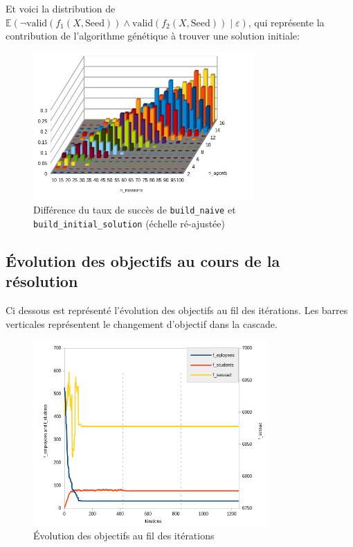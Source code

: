 \documentclass[11pt]{article}
\begin{document}
Et voici la distribution de $\mathbb{E}(\neg \text{valid}(f_1(X, \text{Seed})) \land \text{valid}(f_2(X, \text{Seed})) \;\vert\; \varepsilon)$, qui représente la contribution de l'algorithme génétique à trouver une solution initiale:

\begin{figure}[H]
    \centering
    \includegraphics[width=0.75\textwidth]{Images/initial-diff.png}
    \caption{Différence du taux de succès de \texttt{build\_naive} et \texttt{build\_initial\_solution} (échelle ré-ajustée)}
    \label{fig:diff_success}
\end{figure}

\subsection{Évolution des objectifs au cours de la résolution}

Ci dessous est représenté l'évolution des objectifs au fil des itérations. Les barres verticales représentent le changement d'objectif dans la cascade.

\begin{figure}[H]
    \centering
    \includegraphics[width=0.8\textwidth]{Images/score_evolution_graph.png}
    \caption{Évolution des objectifs au fil des itérations}
    \label{fig:score_evolution}
\end{figure}
\end{document}

